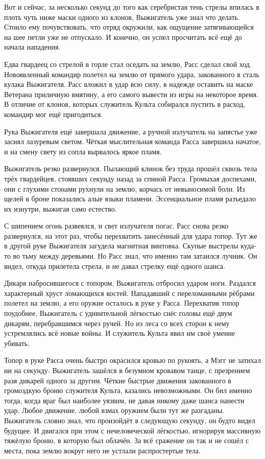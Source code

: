 Вот и сейчас, за несколько секунд до того как серебристая тень стрелы впилась в 
плоть чуть ниже маски одного из клонов, Выжигатель уже знал что делать. Стоило 
ему почувствовать, что отряд окружили, как ощущение затягивающейся на шее петли 
уже не отпускало. И конечно, он успел просчитать всё ещё до начала нападения.

Едва гвардеец со стрелой в горле стал оседать на землю, Расс сделал свой ход. 
Новоявленный командир полетел на землю от прямого удара, закованного в сталь 
кулака Выжигателя. Расс вложил в удар всю силу, в надежде оставить на маске 
Ветерана приличную вмятину, а его самого вывести из игры на некоторое время. В 
отличие от клонов, которых служитель Культа собирался пустить в расход, командир 
мог ещё пригодиться.

Рука Выжигателя ещё завершала движение, а ручной излучатель на запястье уже 
засиял лазуревым светом. Чёткая мыслительная команда Расса завершила начатое, и 
на смену свету из сопла вырвалось яркое пламя.

Выжигатель резко развернулся. Пылающий клинок без труда прошёл сквозь тела трёх 
гвардейцев, стоявших секунду назад за спиной Расса. Громыхая доспехами, они с 
глухими стонами рухнули на землю, корчась от невыносимой боли. Из щелей в броне 
показались алые языки пламени. Эссенциальное пламя разъедало их изнутри, выжигая 
само естество.

С шипением огонь развеялся, и свет излучателя погас. Расс снова резко 
развернулся, на этот раз, чтобы перехватить занесённый для удара топор. Тут же в 
другой руке Выжигателя загудела магнитная винтовка. Скупые выстрелы куда-то во 
тьму между деревьями. Но Расс знал, что именно там затаился лучник. Он видел, 
откуда прилетела стрела, и не давал стрелку ещё одного шанса.

Дикаря набросившегося с топором, Выжигатель отбросил ударом ноги. Раздался 
характерный хруст ломающихся костей. Нападавший с переломанными рёбрами полетел 
на землю, а его оружие осталось в руке у Расса. Перехватив топор поудобнее, 
Выжигатель с удивительной лёгкостью снёс головы ещё двум дикарям, перебравшимся 
через ручей. Но из леса со всех сторон к нему устремлялись всё новые войны. И 
служитель Культа явил им своё умение убивать.

Топор в руке Расса очень быстро окрасился кровью по рукоять, а Мэгг не затихал 
ни на секунду. Выжигатель зашёлся в безумном кровавом танце, с презрением разя 
дикарей одного за другим. Чёткие быстрые движения закованного в громоздкую броню 
служителя Культа, казались невозможными. Он бил именно тогда, когда враг был 
наиболее уязвим, не давая никому даже шанса нанести удар. Любое движение, любой 
взмах оружием были тут же разгаданы. Выжигатель словно знал, что произойдёт в 
следующую секунду, он будто видел будущее. И двигался при этом с нечеловеческой 
лёгкостью, игнорируя массивную тяжёлую броню, в которую был облачён. За всё 
сражение он так и не сошёл с места, пока землю вокруг него не устлали 
распростертые тела.

